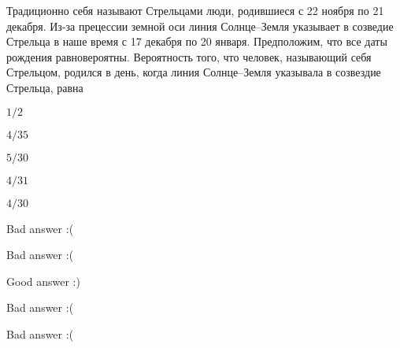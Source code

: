 
\begin{question}
Традиционно себя называют Стрельцами люди, родившиеся с 22 ноября по 21
декабря. Из-за прецессии земной оси линия Солнце--Земля указывает в
созведие Стрельца в наше время с 17 декабря по 20 января. Предположим,
что все даты рождения равновероятны. Вероятность того, что человек,
называющий себя Стрельцом, родился в день, когда линия Солнце--Земля
указывала в созвездие Стрельца, равна
\begin{answerlist}
  \item \(1/2\)
  \item \(4/35\)
  \item \(5/30\)
  \item \(4/31\)
  \item \(4/30\)
\end{answerlist}
\end{question}

\begin{solution}
\begin{answerlist}
  \item Bad answer :(
  \item Bad answer :(
  \item Good answer :)
  \item Bad answer :(
  \item Bad answer :(
\end{answerlist}
\end{solution}

